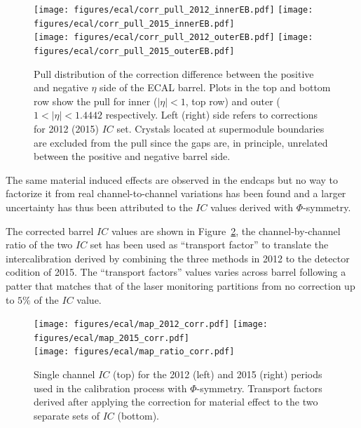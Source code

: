 \begin{figure}[h!]
  \centering
  \texttt{[image: figures/ecal/corr\_pull\_2012\_innerEB.pdf]}
  \texttt{[image: figures/ecal/corr\_pull\_2015\_innerEB.pdf]}\\
  \texttt{[image: figures/ecal/corr\_pull\_2012\_outerEB.pdf]}
  \texttt{[image: figures/ecal/corr\_pull\_2015\_outerEB.pdf]}
  \caption{Pull distribution of the correction difference between the positive and negative $\eta$ side of the ECAL barrel.
    Plots in the top and bottom row show the pull for inner ($|\eta| < 1$, top row) and outer ($1 < |\eta| < 1.4442$
    respectively. Left (right) side refers to corrections for 2012 (2015) $IC$ set. Crystals located at supermodule
    boundaries are excluded from the pull since the gaps are, in principle, unrelated between the positive and negative
  barrel side.}
  \label{fig:correction_pull}
\end{figure}


The same material induced effects are observed in the endcaps but no way to factorize it from real channel-to-channel
variations has been found and a larger uncertainty has thus been attributed to the $IC$ values derived with $\Phi$-symmetry.

The corrected barrel $IC$ values are shown in Figure~\ref{fig:ic_corrected},
the channel-by-channel ratio of the two $IC$ set %
has been used as ``transport factor'' to translate the intercalibration
derived by combining the three methods in 2012 to the detector codition of 2015.
The ``transport factors'' values varies across barrel following a patter that matches that of the laser monitoring
partitions from no correction up to $5\%$ of the $IC$ value. %

\begin{figure}[h!]
  \centering
  \texttt{[image: figures/ecal/map\_2012\_corr.pdf]}
  \texttt{[image: figures/ecal/map\_2015\_corr.pdf]}\\
  \texttt{[image: figures/ecal/map\_ratio\_corr.pdf]}  
  \caption{Single channel $IC$ (top) for the 2012 (left) and 2015 (right) periods used in the calibration process with
    $\Phi$-symmetry. Transport factors derived after applying the correction for material effect to the two
    separate sets of $IC$ (bottom).}
  \label{fig:ic_corrected}
\end{figure}

